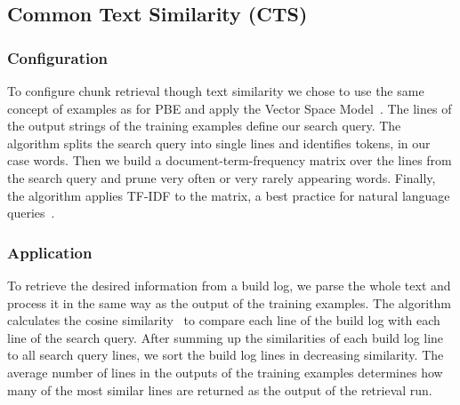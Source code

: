 \subsection{Common Text Similarity (CTS)}
\label{sec:expl-ts}

\subsubsection{Configuration}
To configure chunk retrieval though text similarity we chose to use
the same concept of examples as for PBE\@
and apply the Vector Space Model~\cite{schutze2008introduction}. The
lines of the output strings of the training examples define our search
query. The algorithm splits the search query into single lines and
identifies tokens, in our case words. Then we build a
document-term-frequency matrix over the lines from the search query
and prune very often or very rarely appearing words. Finally, the
algorithm applies TF-IDF to the matrix, a best practice for natural
language queries~\cite{lee1997document}.

\subsubsection{Application}
To retrieve the desired information from a build log, we parse the
whole text and process it in the same way as the output of the
training examples. The algorithm calculates the cosine
similarity~\cite{korenius2007principal} to compare each line of the
build log with each line of the search query. After summing up the
similarities of each build log line to all search query lines, we sort
the build log lines in decreasing similarity. The average number of
lines in the outputs of the training examples determines how many of
the most similar lines are returned as the output of the retrieval
run.

